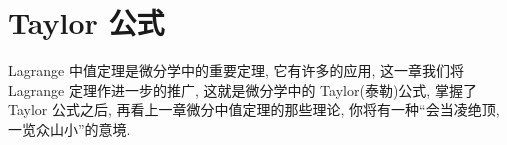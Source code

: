 
\chapter{Taylor 公式}\label{ch:4}

Lagrange 中值定理是微分学中的重要定理, 它有许多的应用, 这一章我们将 Lagrange 定理作进一步的推广, 这就是微分学中的 Taylor(泰勒)公式, 掌握了 Taylor 公式之后, 再看上一章微分中值定理的那些理论, 你将有一种“会当凌绝顶, 一览众山小”的意境.





